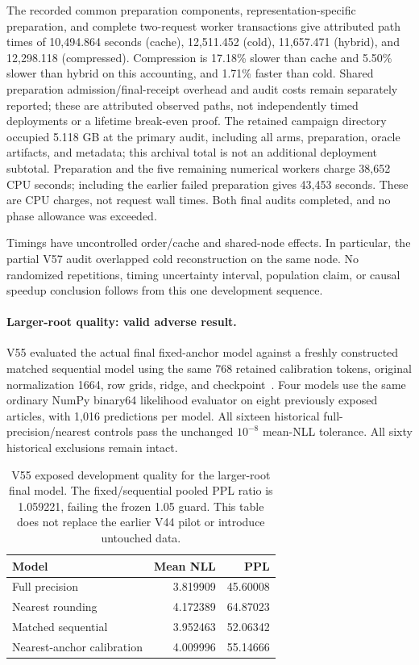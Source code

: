 \documentclass[10pt,twocolumn,letterpaper]{article}
\begin{document}
The recorded common preparation components, representation-specific preparation,
and complete two-request worker transactions give attributed path times of
10,494.864 seconds (cache), 12,511.452 (cold), 11,657.471 (hybrid), and
12,298.118 (compressed). Compression is 17.18\% slower than cache and 5.50\%
slower than hybrid on this accounting, and 1.71\% faster than cold. Shared
preparation admission/final-receipt overhead and audit costs remain separately
reported; these are attributed observed paths, not independently timed
deployments or a lifetime break-even proof. The retained campaign directory
occupied 5.118 GB at the primary audit, including all arms, preparation, oracle
artifacts, and metadata; this archival total is not an additional deployment
subtotal. Preparation and the five remaining
numerical workers charge 38,652 CPU seconds; including the earlier failed
preparation gives 43,453 seconds. These are CPU charges, not request wall times.
Both final audits completed, and no phase allowance was exceeded.

Timings have uncontrolled order/cache and shared-node effects. In particular,
the partial V57 audit overlapped cold reconstruction on the same node. No
randomized repetitions, timing uncertainty interval, population claim, or
causal speedup conclusion follows from this one development sequence.

\paragraph{Larger-root quality: valid adverse result.}
V55 evaluated the actual final fixed-anchor model against a freshly constructed
matched sequential model using the same 768 retained calibration tokens,
original normalization 1664, row grids, ridge, and checkpoint~\cite{v56plan,v58terminal}.
Four models use the same ordinary NumPy binary64 likelihood evaluator on eight
previously exposed articles, with 1,016 predictions per model. All sixteen
historical full-precision/nearest controls pass the unchanged $10^{-8}$
mean-NLL tolerance. All sixty historical exclusions remain intact.

\begin{table}[t]
\centering
\small
\begin{tabular}{lrr}
\toprule
Model & Mean NLL & PPL \\
\midrule
Full precision & 3.819909 & 45.60008 \\
Nearest rounding & 4.172389 & 64.87023 \\
Matched sequential & 3.952463 & 52.06342 \\
Nearest-anchor calibration & 4.009996 & 55.14666 \\
\bottomrule
\end{tabular}
\caption{V55 exposed development quality for the larger-root final model.
The fixed/sequential pooled PPL ratio is 1.059221, failing the frozen 1.05 guard.
This table does not replace the earlier V44 pilot or introduce untouched data.}
\label{tab:v55}
\end{table}
\end{document}
